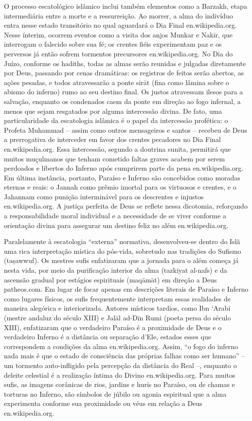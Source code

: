 O processo escatológico islâmico inclui também elementos como a Barzakh, etapa intermediária entre a morte e a ressurreição. Ao morrer, a alma do indivíduo entra nesse estado transitório no qual aguardará o Dia Final en.wikipedia.org. Nesse ínterim, ocorrem eventos como a visita dos anjos Munkar e Nakīr, que interrogam o falecido sobre sua fé; os crentes fiéis experimentam paz e os perversos já então sofrem tormentos precursores en.wikipedia.org. No Dia do Juízo, conforme os hadiths, todas as almas serão reunidas e julgadas diretamente por Deus, passando por cenas dramáticas: os registros de feitos serão abertos, as ações pesadas, e todos atravessarão a ponte sirāt (fina como lâmina sobre o abismo do inferno) rumo ao seu destino final. Os justos atravessam ilesos para a salvação, enquanto os condenados caem da ponte em direção ao fogo infernal, a menos que sejam resgatados por alguma intercessão divina. De fato, uma particularidade da escatologia islâmica é o papel da intercessão profética: o Profeta Muhammad -- assim como outros mensageiros e santos -- recebeu de Deus a prerrogativa de interceder em favor dos crentes pecadores no Dia Final en.wikipedia.org. Essa intercessão, segundo a doutrina sunita, permitirá que muitos muçulmanos que tenham cometido faltas graves acabem por serem perdoados e libertos do Inferno após cumprirem parte da pena en.wikipedia.org. Em última instância, portanto, Paraíso e Inferno são concebidos como moradas eternas e reais: o Jannah como prêmio imortal para os virtuosos e crentes, e o Jahannam como punição interminável para os descrentes e injustos en.wikipedia.org. A justiça perfeita de Deus se reflete nessa dicotomia, reforçando a responsabilidade moral individual e a necessidade de se viver conforme a orientação divina para assegurar um destino feliz no além en.wikipedia.org.

Paralelamente à escatologia “externa” normativa, desenvolveu-se dentro do Islã uma rica interpretação mística do pós-vida, sobretudo nas tradições do Sufismo (ta\d{s}awwuf). Os mestres sufis enfatizaram que a jornada para o além começa já nesta vida, por meio da purificação interior da alma (tazkiyat al-nafs) e da ascensão gradual por estágios espirituais (maqāmāt) em direção a Deus patheos.com. Em lugar de focar apenas em descrições literais de Paraíso e Inferno como lugares físicos, os sufis frequentemente interpretam essas realidades de maneira alegórica e interiorizada. Autores místicos tardios, como Ibn ‘Arabī (mestre andaluz do século XIII) e Jalāl ad-Dīn Rumi (poeta persa do século XIII), enfatizaram que o verdadeiro Paraíso é a proximidade de Deus e o verdadeiro Inferno é a distância ou separação d’Ele, estados esses que correspondem a condições da alma en.wikipedia.org. Assim, “o fogo do inferno nada mais é que o estado de consciência das próprias falhas como ser humano” -- um tormento auto-infligido pela percepção da distância do Real --, enquanto o deleite celestial é a realização íntima do Divino en.wikipedia.org. Para muitos sufis, as imagens corânicas de rios, jardins e hurīs no Paraíso, ou de chamas e torturas no Inferno, são símbolos de júbilo ou agonia espiritual que a alma experimenta conforme sua proximidade ou véus em relação a Deus en.wikipedia.org.

